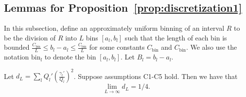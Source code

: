 \documentclass{article}
\newcommand{\bin}{\text{bin}}
\begin{document}
\subsection{Lemmas for Proposition~\ref{prop:discretization1}}
In this subsection, define an approximately uniform binning of an interval $R$ to be the division of $R$ into $L$ bins $[a_l, b_l]$ such that the length of each bin is bounded $\frac{C_\bin}{L} \leq b_l - a_l \leq \frac{C_\bin}{L}$ for some constants $C_\bin$ and $C_\bin$. We also use the notation $\bin_l$ to denote the bin $[a_l, b_l]$. Let $B_l = b_l - a_l$. 

\begin{lemma}
\label{prop:d_dL_convergence}
Let $d_L = \sum_l Q_l' \left( \frac{\gamma_l'}{Q_l} \right)^2$. Suppose assumptions C1-C5 hold. Then we have that
\[
\lim_{L \to \infty} d_L = 1/4.
\]
\end{lemma}
\end{document}
